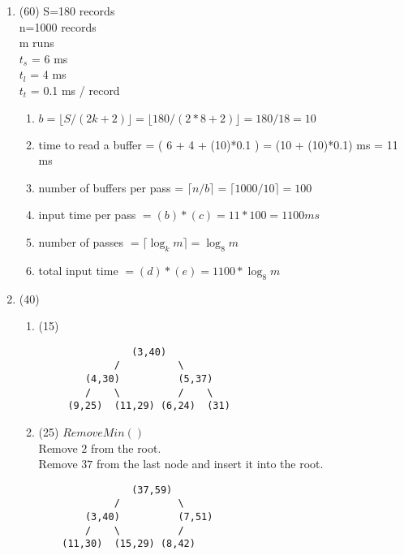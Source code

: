 \begin{enumerate}
\item (60)
  S=180 records \\
  n=1000 records \\
  m runs \\
  $t_s$ = 6 ms \\
  $t_l$ = 4 ms \\
  $t_t$ = 0.1 ms / record

  \begin{enumerate}
   \item  $b = \lfloor S / (2k+2) \rfloor = \lfloor 180/ (2*8+2) \rfloor
          = 180/18 =10 $
   \item  time to read a buffer
           = ( 6 + 4 + (10)*0.1 ) = (10 + (10)*0.1) ms
           = 11 ms
   \item number of buffers per pass
           = $\lceil n/b \rceil = \lceil 1000 / 10 \rceil = 100 $
   \item input time per pass
           $ = (b) * (c) = 11*100 = 1100ms $
   \item number of passes
           $ = \lceil \log_{k} m  \rceil = \log_{8} m $
   \item total input time
           $ = (d) * (e) = 1100* \log_{8} m $
  \end{enumerate} 


\item (40)
 \begin{enumerate}
  \item (15)
   \begin{verbatim} 
                (3,40)                      
             /          \                    
        (4,30)          (5,37)             
        /    \          /    \                                 
     (9,25)  (11,29) (6,24)  (31)              
   \end{verbatim}

  \item (25) $RemoveMin()$ \\
    Remove $2$ from the root. \\ 
    Remove $37$ from the last node and insert it into the root. \\
   
   \begin{verbatim}
                (37,59)                      
             /          \                    
        (3,40)          (7,51)             
        /    \          /                                    
    (11,30)  (15,29) (8,42)          

 


\end{verbatim}
\end{enumerate}
\end{enumerate}
